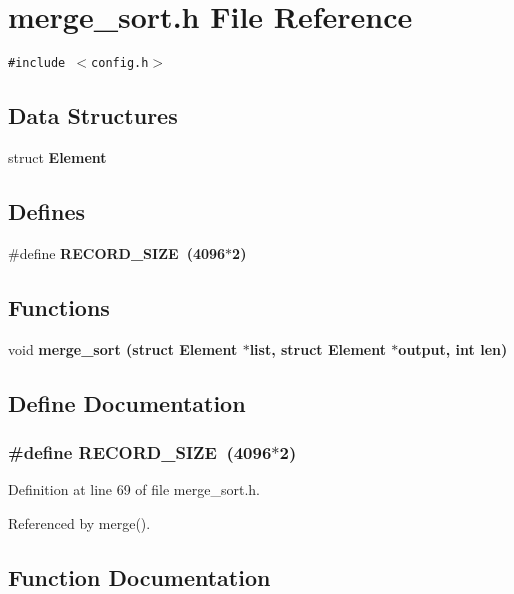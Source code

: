 \section{merge\_\-sort.h File Reference}
\label{merge__sort_8h}
{\tt \#include $<$config.h$>$}\par
\subsection*{Data Structures}
\begin{CompactItemize}
\item 
struct \bf{Element}
\end{CompactItemize}
\subsection*{Defines}
\begin{CompactItemize}
\item 
\#define \bf{RECORD\_\-SIZE}~(4096$\ast$2)
\end{CompactItemize}
\subsection*{Functions}
\begin{CompactItemize}
\item 
void \bf{merge\_\-sort} (struct \bf{Element} $\ast$\bf{list}, struct \bf{Element} $\ast$output, int len)
\end{CompactItemize}


\subsection{Define Documentation}
\subsubsection{\setlength{\rightskip}{0pt plus 5cm}\#define RECORD\_\-SIZE~(4096$\ast$2)}\label{merge__sort_8h_f9fedaf1e9f864ee9393b80201ce6465}




Definition at line 69 of file merge\_\-sort.h.

Referenced by merge().

\subsection{Function Documentation}
